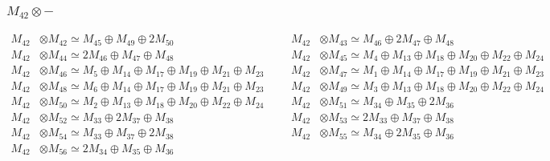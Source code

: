 \subsubsection{$ M_{42}\otimes -$}
\begin{align*}
M_{42} &\otimes M_{42} \simeq M_{45} \oplus M_{49} \oplus 2M_{50} &&& M_{42} &\otimes M_{43} \simeq M_{46} \oplus 2M_{47} \oplus M_{48}\\
M_{42} &\otimes M_{44} \simeq 2M_{46} \oplus M_{47} \oplus M_{48} &&& M_{42} &\otimes M_{45} \simeq M_{4} \oplus M_{13} \oplus M_{18} \oplus M_{20} \oplus M_{22} \oplus M_{24}\\
M_{42} &\otimes M_{46} \simeq M_{5} \oplus M_{14} \oplus M_{17} \oplus M_{19} \oplus M_{21} \oplus M_{23} &&& M_{42} &\otimes M_{47} \simeq M_{1} \oplus M_{14} \oplus M_{17} \oplus M_{19} \oplus M_{21} \oplus M_{23}\\
M_{42} &\otimes M_{48} \simeq M_{6} \oplus M_{14} \oplus M_{17} \oplus M_{19} \oplus M_{21} \oplus M_{23} &&& M_{42} &\otimes M_{49} \simeq M_{3} \oplus M_{13} \oplus M_{18} \oplus M_{20} \oplus M_{22} \oplus M_{24}\\
M_{42} &\otimes M_{50} \simeq M_{2} \oplus M_{13} \oplus M_{18} \oplus M_{20} \oplus M_{22} \oplus M_{24} &&& M_{42} &\otimes M_{51} \simeq M_{34} \oplus M_{35} \oplus 2M_{36}\\
M_{42} &\otimes M_{52} \simeq M_{33} \oplus 2M_{37} \oplus M_{38} &&& M_{42} &\otimes M_{53} \simeq 2M_{33} \oplus M_{37} \oplus M_{38}\\
M_{42} &\otimes M_{54} \simeq M_{33} \oplus M_{37} \oplus 2M_{38} &&& M_{42} &\otimes M_{55} \simeq M_{34} \oplus 2M_{35} \oplus M_{36}\\
M_{42} &\otimes M_{56} \simeq 2M_{34} \oplus M_{35} \oplus M_{36}
\end{align*}

